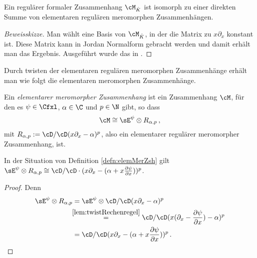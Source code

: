\begin{thm} \label{thm:regulaerInDirSumme}
Ein regulärer formaler Zusammenhang $\cM_{\hat K}$ ist isomorph zu einer
direkten Summe von elementaren regulären meromorphen Zusammenhängen.
\end{thm}
\begin{proof}[Beweisskizze]
Man wählt eine Basis von $\cM_{\hat K}$, in der die Matrix zu $x\partial_x$
konstant ist. Diese Matrix kann in Jordan Normalform gebracht werden und damit
erhält man das Ergebnis.
Ausgeführt wurde das in \cite[Cor. 5.2.6]{sabbah_cimpa90}.
\end{proof}

\begin{comment}
einführen als Bausteine oder kleinste meromorphe Zusammenhänge
\end{comment}

Durch twisten der elementaren regulären meromorphen Zusammenhänge erhält man
wie folgt die elementaren meromorphen Zusammenhänge.
\begin{defn} \label{defn:elemMerZsh}
Ein \emph{elementarer meromorpher Zusammenhang} ist ein Zusammenhang $\cM$, für
den es $\psi \in \Cfxl$, $\alpha\in\C$ und $p\in \N$ gibt, so dass
\[
\cM\cong \sE^{\psi}\otimes R_{\alpha,p}\,,
\]
mit $R_{\alpha,p}:=\cD/\cD(x\partial_x-\alpha)^p$, also ein elementarer
regulärer meromorpher Zusammenhang, ist.
\end{defn}

\begin{lem} In der Situation von Definition \ref{defn:elemMerZsh} gilt
$\sE^{\psi}\otimes R_{\alpha,p}\cong
\cD/\cD\cdot(x\partial_x-(\alpha+x\frac{\partial \psi}{\partial x}))^p$.
\end{lem}
\begin{proof} Denn
\begin{align*}
\sE^{\psi}\otimes R_{\alpha,p}&=\sE^{\psi}\otimes\cD/\cD(x\partial_x-\alpha)^p
\\&\!\!\overset{\ref{lem:twistRechenregel}}{=}
  \cD/\cD(x(\partial_x-\frac{\partial \psi}{\partial x})-\alpha)^p
\\&=\cD/\cD(x\partial_x-(\alpha+x\frac{\partial \psi}{\partial x}))^p \,.
\end{align*}
\end{proof}

